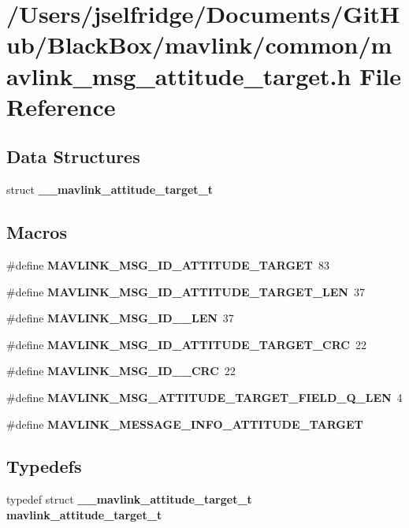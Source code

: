 \section{/\+Users/jselfridge/\+Documents/\+Git\+Hub/\+Black\+Box/mavlink/common/mavlink\+\_\+msg\+\_\+attitude\+\_\+target.h File Reference}
\label{mavlink__msg__attitude__target_8h}
\subsection*{Data Structures}
\begin{DoxyCompactItemize}
\item 
struct \textbf{ \+\_\+\+\_\+mavlink\+\_\+attitude\+\_\+target\+\_\+t}
\end{DoxyCompactItemize}
\subsection*{Macros}
\begin{DoxyCompactItemize}
\item 
\#define \textbf{ M\+A\+V\+L\+I\+N\+K\+\_\+\+M\+S\+G\+\_\+\+I\+D\+\_\+\+A\+T\+T\+I\+T\+U\+D\+E\+\_\+\+T\+A\+R\+G\+ET}~83
\item 
\#define \textbf{ M\+A\+V\+L\+I\+N\+K\+\_\+\+M\+S\+G\+\_\+\+I\+D\+\_\+\+A\+T\+T\+I\+T\+U\+D\+E\+\_\+\+T\+A\+R\+G\+E\+T\+\_\+\+L\+EN}~37
\item 
\#define \textbf{ M\+A\+V\+L\+I\+N\+K\+\_\+\+M\+S\+G\+\_\+\+I\+D\+\_\+\_\+\+L\+EN}~37
\item 
\#define \textbf{ M\+A\+V\+L\+I\+N\+K\+\_\+\+M\+S\+G\+\_\+\+I\+D\+\_\+\+A\+T\+T\+I\+T\+U\+D\+E\+\_\+\+T\+A\+R\+G\+E\+T\+\_\+\+C\+RC}~22
\item 
\#define \textbf{ M\+A\+V\+L\+I\+N\+K\+\_\+\+M\+S\+G\+\_\+\+I\+D\+\_\+\_\+\+C\+RC}~22
\item 
\#define \textbf{ M\+A\+V\+L\+I\+N\+K\+\_\+\+M\+S\+G\+\_\+\+A\+T\+T\+I\+T\+U\+D\+E\+\_\+\+T\+A\+R\+G\+E\+T\+\_\+\+F\+I\+E\+L\+D\+\_\+\+Q\+\_\+\+L\+EN}~4
\item 
\#define \textbf{ M\+A\+V\+L\+I\+N\+K\+\_\+\+M\+E\+S\+S\+A\+G\+E\+\_\+\+I\+N\+F\+O\+\_\+\+A\+T\+T\+I\+T\+U\+D\+E\+\_\+\+T\+A\+R\+G\+ET}
\end{DoxyCompactItemize}
\subsection*{Typedefs}
\begin{DoxyCompactItemize}
\item 
typedef struct \textbf{ \+\_\+\+\_\+mavlink\+\_\+attitude\+\_\+target\+\_\+t} \textbf{ mavlink\+\_\+attitude\+\_\+target\+\_\+t}
\end{DoxyCompactItemize}


